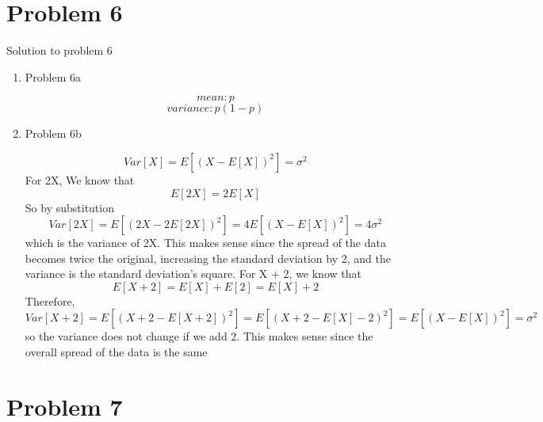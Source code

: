 \documentclass[11pt]{article}
\newcommand{\solution}[1]{{{\color{blue}{\bf Solution:} {#1}}}}
\begin{document}
\newpage

\section{Problem 6}

\solution{Solution to problem 6}
\begin{enumerate}
\item Problem 6a

\solution{
\[mean:  p \]
\[ variance: p(1-p) \]
}

\vspace{0.5cm}
\item Problem 6b

\solution{
\[ Var[X] = E[(X - E[X])^{2} ] = \sigma^{2} \]
For 2X, We know that
\[ E[2X] = 2E[X] \]
So by substitution
\[ Var[2X] = E[(2X - 2E[2X])^{2} ] = 4E[(X - E[X])^{2}] = 4\sigma^{2}\] 
which is the variance of 2X. This makes sense since the spread of the data becomes twice the original, increasing the standard deviation by 2, and the variance is the standard deviation's square.
\newline \newline
For X + 2, we know that
\[E[X + 2] = E[X] + E[2] = E[X] + 2 \]
Therefore, 
\[ Var[X + 2] = E[(X + 2 - E[X + 2])^{2}] = E[(X + 2 - E[X] - 2)^{2}] = E[(X - E[X])^{2}] = \sigma^{2} \]
so the variance does not change if we add 2. This makes sense since the overall spread of the data is the same
}

\end{enumerate}
\newpage

\section{Problem 7}
\end{document}
